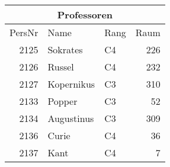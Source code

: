 {
\begin{tabular}[t]{|r|l|l|r|}
  \hline
  \multicolumn{4}{|c|}{Professoren}\\
  \hline
  PersNr & Name & Rang & Raum\\
  \hline\hline
  2125 & Sokrates & C4 & 226\\
  2126 & Russel & C4 & 232\\
  2127 & Kopernikus & C3 & 310\\
  2133 & Popper & C3 & 52\\
  2134 & Augustinus & C3 & 309\\
  2136 & Curie & C4 & 36\\
  2137 & Kant & C4 & 7\\
  \hline
\end{tabular}}
